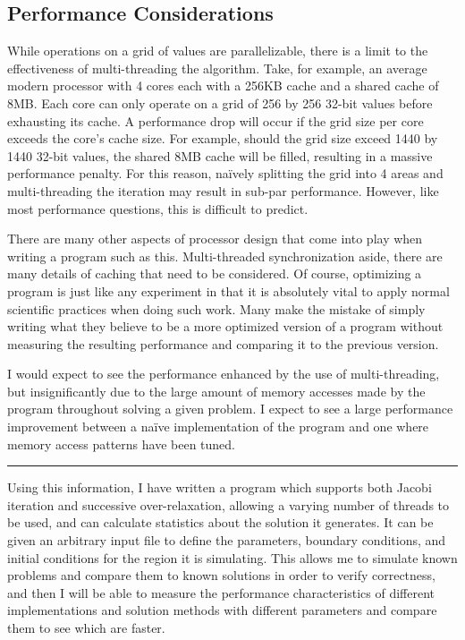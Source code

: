 \subsection{Performance Considerations}
While operations on a grid of values are parallelizable, there is a limit to
the effectiveness of multi-threading the algorithm. Take, for example, an average
modern processor with 4 cores each with a 256KB cache and a shared cache of 8MB\@. Each core
can only operate on a grid of 256 by 256 32-bit values before exhausting its cache.
A performance drop will occur if the grid size per core exceeds the core's cache
size. For example, should the grid size exceed 1440 by 1440 32-bit values,
the shared 8MB cache will
be filled, resulting in a massive performance penalty. For this reason, na\"{i}vely splitting
the grid into 4 areas and multi-threading the iteration may result in sub-par performance.
However, like most performance questions, this is difficult to predict.

There are many other aspects of processor design that come into play when writing a program
such as this. Multi-threaded synchronization aside, there are many details of caching that
need to be considered. Of course, optimizing a program is just like any experiment in that
it is absolutely vital to apply normal scientific practices when doing such work. Many make
the mistake of simply writing what they believe to be a more optimized version of a program
without measuring the resulting performance and comparing it to the previous version.

I would expect to see the performance enhanced by the use of multi-threading, but insignificantly
due to the large amount of memory accesses made by the program throughout solving a given problem.
I expect to see a large performance improvement between a na\"{i}ve implementation of the program
and one where memory access patterns have been tuned.


\begin{center}\rule{2cm}{0.4pt}\end{center}

Using this information, I have written a program which supports both Jacobi iteration and successive over-relaxation,
allowing a varying number of threads to be used, and can calculate statistics about the solution it generates.
It can be given an arbitrary input file to define the parameters, boundary conditions, and initial conditions for
the region it is simulating. This allows me to simulate known problems and compare them to known solutions in order
to verify correctness, and then I will be able
to measure the performance characteristics of different implementations and solution methods with different parameters
and compare them to see which are faster.

